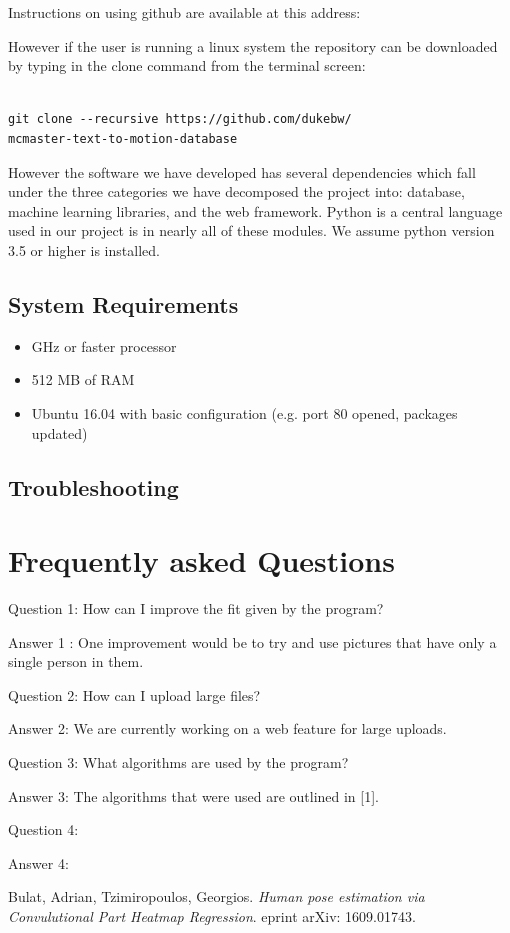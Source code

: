 \documentclass{scrreprt}
\begin{document}
Instructions on using github are available at this address:

However if the user is running a linux system the repository can be downloaded
by typing in the clone command from the terminal screen:

\begin{lstlisting}

git clone --recursive https://github.com/dukebw/
mcmaster-text-to-motion-database

\end{lstlisting}

However the software we have developed has several dependencies which fall
under the three categories we have decomposed the project into: database,
machine learning libraries, and the web framework.  Python is a central
language used in our project is in nearly all of these modules.  We assume
python version 3.5 or higher is installed.


\subsection{System Requirements}

\begin{itemize}
\item GHz or faster processor
\item 512 MB of RAM
\item Ubuntu 16.04 with basic configuration (e.g. port 80 opened, packages updated)
\end{itemize}


\subsection{Troubleshooting}

\section{Frequently asked Questions}

Question 1: How can I improve the fit given by the program?

Answer 1 : One improvement would be to try and use pictures that have only a single person in them.

Question 2: How can I upload large files?

Answer 2: We are currently working on a web feature for large uploads.

Question 3: What algorithms are used by the program?

Answer 3: The algorithms that were used are outlined in [1].

Question 4:

Answer 4:

\begin{thebibliography}{9}

Bulat, Adrian, Tzimiropoulos, Georgios.
\textit{Human pose estimation via Convulutional Part Heatmap Regression}.
eprint arXiv: 1609.01743.

\end{thebibliography}
\end{document}
